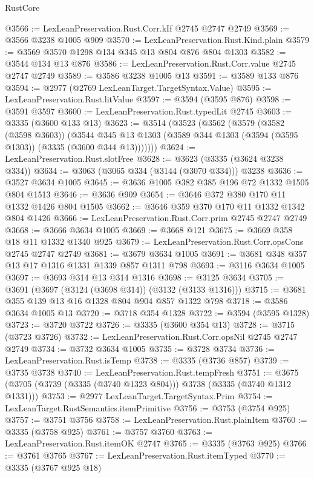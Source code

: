 \begin{lexlean}{RustCore}
\begin{coremodule}
@3566 := LexLeanPreservation.Rust.Corr.kIf @2745 @2747 @2749
@3569 := @3566 @3238 @1005 @909
@3570 := LexLeanPreservation.Rust.Kind.plain
@3579 := @3569 @3570 @1298 @134 @345 @13 @804 @876 @804 @1303
@3582 := @3544 @134 @13 @876
@3586 := LexLeanPreservation.Rust.Corr.value @2745 @2747 @2749
@3589 := @3586 @3238 @1005 @13
@3591 := @3589 @133 @876
@3594 := @2977 (@2769 LexLeanTarget.TargetSyntax.Value)
@3595 := LexLeanPreservation.Rust.litValue
@3597 := @3594 (@3595 @876)
@3598 := @3591 @3597
@3600 := LexLeanPreservation.Rust.typedLit @2745
@3603 := @3335 (@3600 @133 @13)
@3623 := @3514
    (@3523
      (@3562
        (@3579
          (@3582 (@3598 @3603))
          (@3544
            @345
            @13
            @1303
            (@3589 @344 @1303 (@3594 (@3595 @1303)) (@3335 (@3600 @344 @13)))))))
@3624 := LexLeanPreservation.Rust.slotFree
@3628 := @3623 (@3335 (@3624 @3238 @334))
@3634 := @3063 (@3065 @334 (@3144 (@3070 @334))) @3238
@3636 := @3527 @3634 @1005
@3645 := @3636 @1005 @382 @385 @196 @72 @1332 @1505 @804 @1513
@3646 := @3636 @909
@3654 := @3646 @372 @380 @170 @11 @1332 @1426 @804 @1505
@3662 := @3646 @359 @370 @170 @11 @1332 @1342 @804 @1426
@3666 := LexLeanPreservation.Rust.Corr.prim @2745 @2747 @2749
@3668 := @3666 @3634 @1005
@3669 := @3668 @121
@3675 := @3669 @358 @18 @11 @1332 @1340 @925
@3679 := LexLeanPreservation.Rust.Corr.opsCons @2745 @2747 @2749
@3681 := @3679 @3634 @1005
@3691 := @3681 @348 @357 @13 @17 @1316 @1331 @1339 @857 @1311 @798
@3693 := @3116 @3634 @1005
@3697 := @3693 @314 @13 @314 @1316
@3698 := @3125 @3634
@3705 := @3691 (@3697 (@3124 (@3698 @314)) (@3132 (@3133 @1316)))
@3715 := @3681 @355 @139 @13 @16 @1328 @804 @904 @857 @1322 @798
@3718 := @3586 @3634 @1005 @13
@3720 := @3718 @354 @1328
@3722 := @3594 (@3595 @1328)
@3723 := @3720 @3722
@3726 := @3335 (@3600 @354 @13)
@3728 := @3715 (@3723 @3726)
@3732 := LexLeanPreservation.Rust.Corr.opsNil @2745 @2747 @2749
@3734 := @3732 @3634 @1005
@3735 := @3728 @3734
@3736 := LexLeanPreservation.Rust.isTemp
@3738 := @3335 (@3736 @857)
@3739 := @3735 @3738
@3740 := LexLeanPreservation.Rust.tempFresh
@3751 := @3675 (@3705 (@3739 (@3335 (@3740 @1323 @804))) @3738 (@3335 (@3740 @1312 @1331)))
@3753 := @2977 LexLeanTarget.TargetSyntax.Prim
@3754 := LexLeanTarget.RustSemantics.itemPrimitive
@3756 := @3753 (@3754 @925)
@3757 := @3751 @3756
@3758 := LexLeanPreservation.Rust.plainItem
@3760 := @3335 (@3758 @925)
@3761 := @3757 @3760
@3763 := LexLeanPreservation.Rust.itemOK @2747
@3765 := @3335 (@3763 @925)
@3766 := @3761 @3765
@3767 := LexLeanPreservation.Rust.itemTyped
@3770 := @3335 (@3767 @925 @18)

\end{coremodule}
\end{lexlean}
